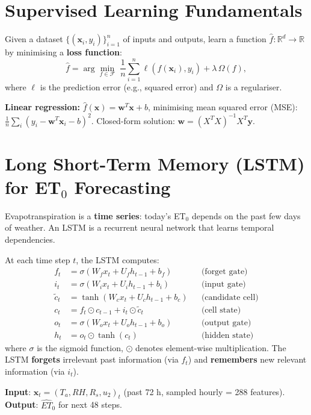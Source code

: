 \documentclass[12pt,a4paper,openany]{book}
\newcommand{\R}{\mathbb{R}}
\newcommand{\bx}{\bm{x}}
\begin{document}
\section{Supervised Learning Fundamentals}

Given a dataset $\{(\bx_i,y_i)\}_{i=1}^n$ of inputs and outputs, learn a function $\hat{f}:\R^d\to\R$ by minimising a \textbf{loss function}:
\begin{equation}
  \hat{f} = \arg\min_{f\in\mathcal{F}}\;\frac{1}{n}\sum_{i=1}^n \ell(f(\bx_i),y_i)+\lambda\,\Omega(f),
\end{equation}
where $\ell$ is the prediction error (e.g., squared error) and $\Omega$ is a regulariser.

\textbf{Linear regression:} $\hat f(\bx)=\bm{w}^T\bx+b$, minimising mean squared error (MSE): $\frac{1}{n}\sum_i(y_i-\bm{w}^T\bx_i-b)^2$. Closed-form solution: $\bm{w}=(X^TX)^{-1}X^T\bm{y}$.

\section{Long Short-Term Memory (LSTM) for ET$_0$ Forecasting}

Evapotranspiration is a \textbf{time series}: today's ET$_0$ depends on the past few days of weather. An LSTM is a recurrent neural network that learns temporal dependencies.

At each time step $t$, the LSTM computes:
\begin{align}
  f_t &= \sigma(W_f x_t + U_f h_{t-1} + b_f) &&\text{(forget gate)}\\
  i_t &= \sigma(W_i x_t + U_i h_{t-1} + b_i) &&\text{(input gate)}\\
  \tilde c_t &= \tanh(W_c x_t + U_c h_{t-1} + b_c) &&\text{(candidate cell)}\\
  c_t &= f_t\odot c_{t-1} + i_t\odot\tilde c_t &&\text{(cell state)}\\
  o_t &= \sigma(W_o x_t + U_o h_{t-1} + b_o) &&\text{(output gate)}\\
  h_t &= o_t\odot\tanh(c_t) &&\text{(hidden state)}
\end{align}
where $\sigma$ is the sigmoid function, $\odot$ denotes element-wise multiplication. The LSTM \textbf{forgets} irrelevant past information (via $f_t$) and \textbf{remembers} new relevant information (via $i_t$).

\textbf{Input}: $\bx_t=(T_a,RH,R_s,u_2)_t$ (past 72 h, sampled hourly = 288 features).
\textbf{Output}: $\hat{ET}_0$ for next 48 steps.
\end{document}
